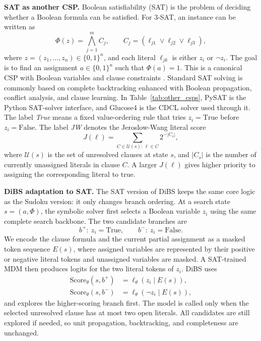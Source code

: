 \documentclass[lettersize,journal]{IEEEtran}
\begin{document}
\textbf{SAT as another CSP.} Boolean satisfiability (SAT) is the problem of deciding whether a Boolean formula can be satisfied. For 3-SAT, an instance can be written as
\begin{equation}
	\Phi(z)=\bigwedge_{j=1}^{m} C_j,\qquad
	C_j=(\ell_{j1}\vee \ell_{j2}\vee \ell_{j3}),
	\label{eq:sat_def}
\end{equation}
where \(z=(z_1,\dots,z_n)\in\{0,1\}^n\), and each literal \(\ell_{jk}\) is either \(z_i\) or \(\neg z_i\). The goal is to find an assignment \(a\in\{0,1\}^n\) such that \(\Phi(a)=1\). This is a canonical CSP with Boolean variables and clause constraints \cite{biere2009sat,biere2021sat2}. Standard SAT solving is commonly based on complete backtracking enhanced with Boolean propagation, conflict analysis, and clause learning. In Table~\ref{tab:other_csps}, PySAT is the Python SAT-solver interface, and Glucose4 is the CDCL solver used through it. The label \textit{True} means a fixed value-ordering rule that tries \(z_i=\mathrm{True}\) before \(z_i=\mathrm{False}\). The label \textit{JW} denotes the Jeroslow-Wang literal score
\begin{equation}
	J(\ell)=\sum_{C\in\mathcal{U}(s):\,\ell\in C}2^{-|C_s|},
	\label{eq:jw_score}
\end{equation}
where \(\mathcal{U}(s)\) is the set of unresolved clauses at state \(s\), and \(|C_s|\) is the number of currently unassigned literals in clause \(C\). A larger \(J(\ell)\) gives higher priority to assigning the corresponding literal to true.

\textbf{DiBS adaptation to SAT.} The SAT version of DiBS keeps the same core logic as the Sudoku version: it only changes branch ordering. At a search state \(s=(a,\Phi)\), the symbolic solver first selects a Boolean variable \(z_i\) using the same complete search backbone. The two candidate branches are
\[
	b^+:\ z_i=\mathrm{True},\qquad b^-:\ z_i=\mathrm{False}.
\]
We encode the clause formula and the current partial assignment as a masked token sequence \(E(s)\), where assigned variables are represented by their positive or negative literal tokens and unassigned variables are masked. A SAT-trained MDM then produces logits for the two literal tokens of \(z_i\). DiBS uses
\begin{equation}
	\begin{aligned}
		\mathrm{Score}_\theta(s,b^+) &= \ell_\theta(z_i\mid E(s)),\\
		\mathrm{Score}_\theta(s,b^-) &= \ell_\theta(\neg z_i\mid E(s)),
	\end{aligned}
	\label{eq:sat_dibs_score}
\end{equation}
and explores the higher-scoring branch first. The model is called only when the selected unresolved clause has at most two open literals. All candidates are still explored if needed, so unit propagation, backtracking, and completeness are unchanged.
\end{document}
